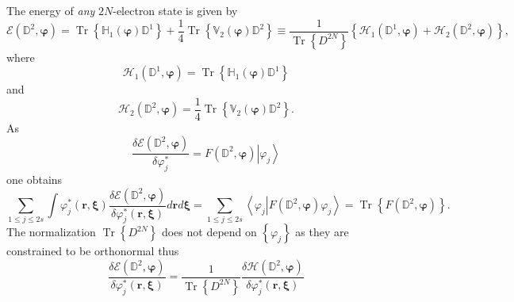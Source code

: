 \documentclass[aps,preprint]{revtex4}%
\begin{document}
The energy of \emph{any} $2N$-electron state is given by
\begin{equation}
\mathcal{E}\left(  \mathbb{D}^{2},\mathbf{\varphi}\right)  =\operatorname{Tr}%
\left\{  \mathbb{H}_{1}\left(  \mathbf{\varphi}\right)  \mathbb{D}%
^{1}\right\}  +\frac{1}{4}\operatorname{Tr}\left\{  \mathbb{V}_{2}\left(
\mathbf{\varphi}\right)  \mathbb{D}^{2}\right\}  \equiv\frac{1}%
{\operatorname{Tr}\left\{  D^{2N}\right\}  }\left\{  \mathcal{H}_{1}\left(
\mathbb{D}^{1},\mathbf{\varphi}\right)  +\mathcal{H}_{2}\left(  \mathbb{D}%
^{2},\mathbf{\varphi}\right)  \right\}  ,
\end{equation}
where
\begin{equation}
\mathcal{H}_{1}\left(  \mathbb{D}^{1},\mathbf{\varphi}\right)
=\operatorname{Tr}\left\{  \mathbb{H}_{1}\left(  \mathbf{\varphi}\right)
\mathbb{D}^{1}\right\}
\end{equation}
and
\begin{equation}
\mathcal{H}_{2}\left(  \mathbb{D}^{2},\mathbf{\varphi}\right)  =\frac{1}%
{4}\operatorname{Tr}\left\{  \mathbb{V}_{2}\left(  \mathbf{\varphi}\right)
\mathbb{D}^{2}\right\}  .
\end{equation}
As
\begin{equation}
\frac{\delta\mathcal{E}\left(  \mathbb{D}^{2},\mathbf{\varphi}\right)
}{\delta\varphi_{j}^{\ast}}=F\left(  \mathbb{D}^{2},\mathbf{\varphi}\right)
\left\vert \varphi_{j}\right\rangle
\end{equation}
one obtains
\begin{equation}%
{\textstyle\sum\limits_{1\leq j\leq2s}}
\int\varphi_{j}^{\ast}\left(  \mathbf{r,\xi}\right)  \frac{\delta
\mathcal{E}\left(  \mathbb{D}^{2},\mathbf{\varphi}\right)  }{\delta\varphi
_{j}^{\ast}\left(  \mathbf{r,\xi}\right)  }d\mathbf{r}d\mathbf{\xi=}%
{\textstyle\sum\limits_{1\leq j\leq2s}}
\left\langle \left.  \varphi_{j}\right\vert F\left(  \mathbb{D}^{2}%
,\mathbf{\varphi}\right)  \varphi_{j}\right\rangle =\operatorname{Tr}\left\{
F\left(  \mathbb{D}^{2},\mathbf{\varphi}\right)  \right\}  .
\end{equation}
The normalization $\operatorname{Tr}\left\{  D^{2N}\right\}  $ does not depend
on $\left\{  \varphi_{j}\right\}  $ as they are constrained to be orthonormal
thus%
\begin{equation}
\frac{\delta\mathcal{E}\left(  \mathbb{D}^{2},\mathbf{\varphi}\right)
}{\delta\varphi_{j}^{\ast}\left(  \mathbf{r,\xi}\right)  }=\frac
{1}{\operatorname{Tr}\left\{  D^{2N}\right\}  }\frac{\delta\mathcal{H}\left(
\mathbb{D}^{2},\mathbf{\varphi}\right)  }{\delta\varphi_{j}^{\ast}\left(
\mathbf{r,\xi}\right)  }%
\end{equation}
\end{document}
